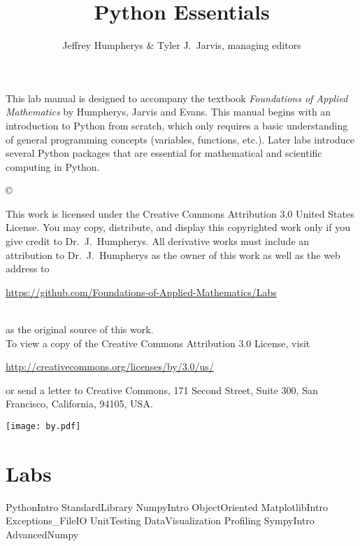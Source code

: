 \documentclass[opener-c,labs,black,nociteref]{HJnewsiambook}
\title{Python Essentials}
\author{Jeffrey Humpherys \& Tyler J.~Jarvis, managing editors}
\begin{document}

\thispagestyle{empty} %
\maketitle
\thispagestyle{empty}
\frontmatter



\begin{thepreface} %

This lab manual is designed to accompany the textbook \emph{Foundations of Applied Mathematics} by Humpherys, Jarvis and Evans.
This manual begins with an introduction to Python \cite{vanrossum2010python} from scratch, which only requires a basic understanding of general programming concepts (variables, functions, etc.).
Later labs introduce several Python packages that are essential for mathematical and scientific computing in Python.

\vfill
\copyright{This work is licensed under the Creative Commons Attribution 3.0 United States
License.  You may copy, distribute, and display this copyrighted work only if you give
credit to Dr.~J.~Humpherys. All derivative works must include an attribution to Dr.~J.~Humpherys as the owner of this work as well as the web address to
\\\centerline{\url{https://github.com/Foundations-of-Applied-Mathematics/Labs}}\\as the original source of this work.
\\To view a copy of the Creative Commons Attribution 3.0 License, visit
\\\centerline{\url{http://creativecommons.org/licenses/by/3.0/us/}} or send a letter to Creative Commons, 171 Second Street, Suite 300, San Francisco, California, 94105, USA.}

\vfill
\centering\texttt{[image: by.pdf]}
\vfill
\end{thepreface}

\setcounter{tocdepth}{1}
\tableofcontents

\mainmatter %

\part{Labs}
{PythonIntro}
{StandardLibrary}
{NumpyIntro}
{ObjectOriented}
{MatplotlibIntro}
{Exceptions_FileIO}
{UnitTesting}
{DataVisualization}
{Profiling}
{SympyIntro}
{AdvancedNumpy}
\end{document}
